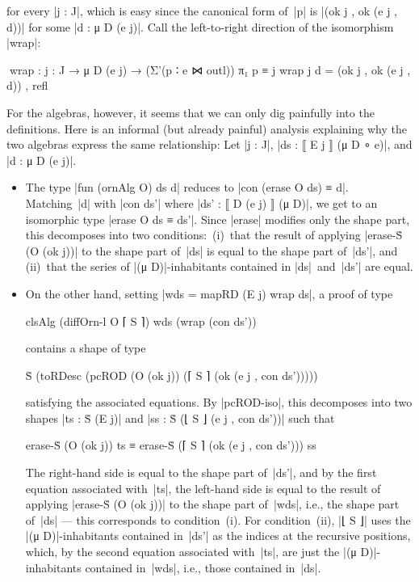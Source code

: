 for every |j : J|, which is easy since the canonical form of~|p| is |(ok j , ok (e j , d))| for some |d : μ D (e j)|.
Call the left-to-right direction of the isomorphism |wrap|:
\begin{code}
^^^wrap : {j : J} → μ D (e j) → (Σ'(p ∶ e ⋈ outl)) π₁ p ≡ j
wrap {j} d = (ok j , ok (e j , d)) , refl
\end{code}
For the algebras, however, it seems that we can only dig painfully into the definitions.
Here is an informal (but already painful) analysis explaining why the two algebras express the same relationship:
Let |j : J|, |ds : ⟦ E j ⟧ (μ D ∘ e)|, and |d : μ D (e j)|.
\begin{itemize}
\item The type |fun (ornAlg O) ds d| reduces to |con (erase O ds) ≡ d|.
Matching~|d| with |con ds'| where |ds' : ⟦ D (e j) ⟧ (μ D)|, we get to an isomorphic type |erase O ds ≡ ds'|.
Since |erase| modifies only the shape part, this decomposes into two conditions: \,(i)~that the result of applying |erase-Ṡ (O (ok j))| to the shape part of~|ds| is equal to the shape part of~|ds'|, and \,(ii)~that the series of |(μ D)|-inhabitants contained in |ds|~and~|ds'| are equal.
\item On the other hand, setting |wds = mapRD (E j) wrap ds|, a proof of type
\begin{code}
clsAlg (diffOrn-l O ⌈ S ⌉) wds (wrap (con ds'))
\end{code}
contains a shape of type
\begin{code}
Ṡ (toRDesc (pcROD (O (ok j)) (⌈ S ⌉ (ok (e j , con ds')))))
\end{code}
satisfying the associated equations.
By |pcROD-iso|, this decomposes into two shapes |ts : Ṡ (E j)| and |ss : Ṡ (⌊ S ⌋ (e j , con ds'))| such that
\begin{code}
erase-Ṡ (O (ok j)) ts ≡ erase-Ṡ (⌈ S ⌉ (ok (e j , con ds'))) ss
\end{code}
The right-hand side is equal to the shape part of~|ds'|, and by the first equation associated with~|ts|, the left-hand side is equal to the result of applying |erase-Ṡ (O (ok j))| to the shape part of~|wds|, i.e., the shape part of~|ds| --- this corresponds to condition~(i).
For condition~(ii), |⌊ S ⌋| uses the |(μ D)|-inhabitants contained in~|ds'| as the indices at the recursive positions, which, by the second equation associated with~|ts|, are just the |(μ D)|-inhabitants contained in~|wds|, i.e., those contained in~|ds|.
\end{itemize}



